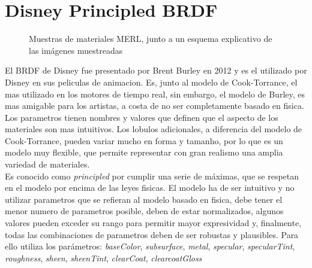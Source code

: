 
\section{Disney Principled BRDF}

\begin{figure}[H]
    \vspace{0.5cm}
    \centering
    \caption{Muestras de materiales MERL, junto a un esquema explicativo de las im\'agenes muestreadas}
    \vspace{0.5cm}
\end{figure}

El BRDF de Disney fue presentado por Brent Burley en 2012 y es el utilizado por Disney en sus peliculas de animacion. Es,
junto al modelo de Cook-Torrance, el mas utilizado en los motores de tiempo real, sin embargo, el modelo de Burley, es mas
amigable para los artistas, a costa de no ser completamente basado en fisica. Los parametros tienen nombres y valores que
definen que el aspecto de los materiales son mas intuitivos. Los lobulos adicionales, a diferencia del modelo de Cook-Torrance,
pueden variar mucho en forma y tamanho, por lo que es un modelo muy flexible, que permite representar con gran realismo una
amplia variedad de materiales.\\

Es conocido como \textit{principled} por cumplir una serie de m\'aximas, que se respetan en el modelo por encima de las leyes fisicas.
El modelo ha de ser intuitivo y no utilizar parametros que se refieran al modelo basado en fisica, debe tener el menor
numero de parametros posible, deben de estar normalizados, algunos valores pueden exceder su rango para permitir mayor
expresividad y, finalmente, todas las combinaciones de parametros deben de ser robustas y plausibles. Para ello utiliza los
par\'ametros: \textit{baseColor}, \textit{subsurface}, \textit{metal}, \textit{specular}, \textit{specularTint}, \textit{roughness},
\textit{sheen}, \textit{sheenTint}, \textit{clearCoat}, \textit{clearcoatGloss}


